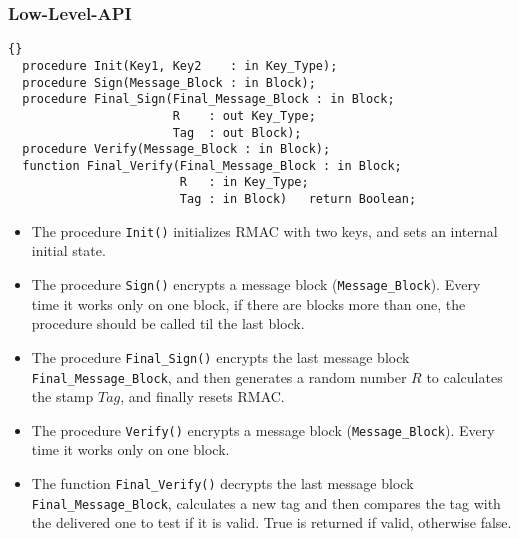 \subsubsection*{Low-Level-API}
\begin{lstlisting}{}
  procedure Init(Key1, Key2    : in Key_Type);
  procedure Sign(Message_Block : in Block);
  procedure Final_Sign(Final_Message_Block : in Block;
                       R    : out Key_Type;
                       Tag  : out Block);
  procedure Verify(Message_Block : in Block);
  function Final_Verify(Final_Message_Block : in Block;
                        R   : in Key_Type;
                        Tag : in Block)   return Boolean;
\end{lstlisting}
\begin{itemize}
\item The procedure \texttt{Init()} initializes RMAC with two keys, and sets an internal initial state.
\item The procedure \texttt{Sign()} encrypts a message block (\texttt{Message\_Block}). Every time it works only on one block, if there are blocks more than one, the procedure should be called til the last block.
\item The procedure \texttt{Final\_Sign()} encrypts the last message block \texttt{Final\_Message\_Block}, and then generates a random number $R$ to calculates the stamp $Tag$, and finally resets RMAC.
\item The procedure \texttt{Verify()} encrypts a message block (\texttt{Message\_Block}). Every time it works only on one block.
\item The function \texttt{Final\_Verify()} decrypts the last message block \texttt{Final\_Message\_Block}, calculates a new tag and then compares the tag with the delivered one to test if it is valid. True is returned if valid, otherwise false.
\end{itemize}
